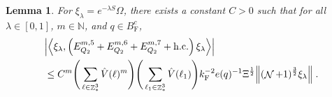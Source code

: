 \documentclass[12pt,a4paper]{article}
\numberwithin{equation}{section}
\newcommand{\NNN}{\mathbb{N}}
\newcommand{\1}{\mathbb{I}}
\newcommand{\F}{\mathrm{F}}
\DeclareMathOperator{\Z}{\mathbb{Z}}
\DeclareMathOperator{\NN}{\mathcal{N}}
\newcommand{\half}{\frac{1}{2}}
\newcommand{\eva}[1]{\left\langle #1 \right\rangle}
\theoremstyle{plain}
\newtheorem{lemma}[theorem]{Lemma}
\theoremstyle{definition}
\theoremstyle{remark}
\theoremstyle{plain}
\theoremstyle{definition}
\theoremstyle{remark}
\begin{document}
\begin{lemma} \label{lem:EQ213}
For $\xi_\lambda = e^{-\lambda S} \Omega$, there exists a constant $ C > 0 $ such that for all $ \lambda \in [0,1] $, $ m \in \NNN $, and $ q \in B_{\F}^c $,
\begin{equation}
\begin{aligned}
	&\abs{\eva{\xi_\lambda,\left(E^{m,5}_{Q_2}+E^{m,6}_{Q_2}+E^{m,7}_{Q_2}+\mathrm{h.c.}\right) \xi_\lambda }} \\
	&\leq C^m \Bigg(\sum\limits_{\ell \in \Z^3_*} \hat{V}(\ell)^m \Bigg)
		\Bigg( \sum\limits_{\ell_1 \in \Z^3_*}\hat{V}(\ell_1) \Bigg)
		k_{\F}^{-2} e(q)^{-1} \Xi^{\half}
		\norm { (\NN+1)^{\frac 32} \xi_\lambda } \;. \label{eq:estEQ213}
\end{aligned}
\end{equation}
\end{lemma}
\end{document}
